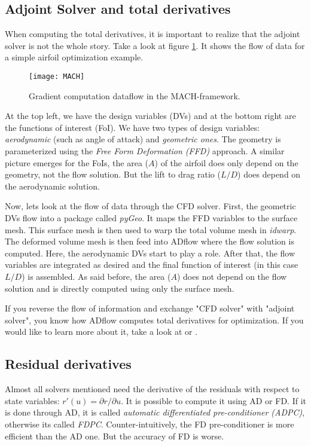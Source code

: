 \subsection{Adjoint Solver and total derivatives}
\label{subsec:adjoint}
When computing the total derivatives, it is important to realize that the
adjoint solver is not the whole story. Take a look at figure \ref{fig:MACH}. It
shows the flow of data for a simple airfoil optimization example.

\begin{figure}[H] \centering
    \texttt{[image: MACH]}
    \caption{Gradient computation dataflow in the MACH-framework. \cite{cm1}}
    \label{fig:MACH}
\end{figure}


\noindent At the top left, we have the design variables (DVs) and at the bottom
right are the functions of interest (FoI). We have two types of design
variables: \textit{aerodynamic} (such as angle of attack) and \textit{geometric
ones}. The geometry is parameterized using the \textit{Free Form Deformation
(FFD)} approach. A similar picture emerges for the FoIs, the area ($A$) of the
airfoil does only depend on the geometry, not the flow solution. But the lift
to drag ratio ($L/D$) does depend on the aerodynamic solution.

Now, lets look at the flow of data through the CFD solver. First, the
geometric DVs flow into a package called \textit{pyGeo}. It maps the FFD
variables to the surface mesh. This surface mesh is then used to warp the total
volume mesh in \textit{idwarp}. The deformed volume mesh is then feed into
ADflow where the flow solution is computed. Here, the aerodynamic DVs start to
play a role. After that, the flow variables are integrated as desired and the
final function of interest (in this case $L/D$) is assembled. As said before,
the area ($A$) does not depend on the flow solution and is directly computed
using only the surface mesh.

If you reverse the flow of information and exchange "CFD solver" with "adjoint
solver", you know how ADflow computes total derivatives for optimization. If
you would like to learn more about it, take a look at \cite{cm1} or
\cite{mdobook}.




\subsection{Residual derivatives}
Almost all solvers mentioned need the derivative of the residuals with respect
to state variables: $r'(u) = \partial r / \partial u$. It is possible to
compute it using AD or FD. If it is done through AD, it is called
\textit{automatic differentiated pre-conditioner (ADPC)}, otherwise its called
\textit{FDPC}. Counter-intuitively, the FD pre-conditioner is more efficient
than the AD one. But the accuracy of FD is worse.

